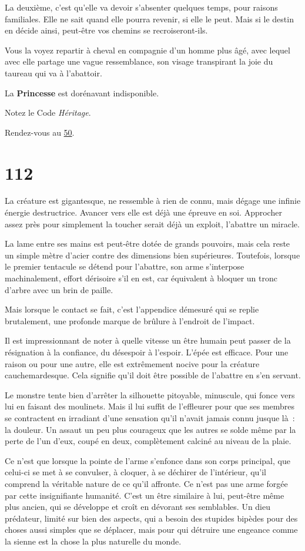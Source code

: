 \documentclass{report}
\newcommand{\gsection}[1]{
    \section{#1}
    \label{section-#1}
}
\newcommand{\glink}[1]{\hyperref[section-#1]{#1}}
\newcommand{\hero}[1]{\textbf{#1}}
\begin{document}
La deuxième, c'est qu'elle va devoir s'absenter quelques temps, pour raisons familiales. Elle ne sait quand elle pourra revenir, si elle le peut. Mais si le destin en décide ainsi, peut-être vos chemins se recroiseront-ils.

Vous la voyez repartir à cheval en compagnie d'un homme plus âgé, avec lequel avec elle partage une vague ressemblance, son visage transpirant la joie du taureau qui va à l'abattoir.

La \hero{Princesse} est dorénavant indisponible.

Notez le Code \emph{Héritage}.

Rendez-vous au \glink{50}.

\gsection{112}

La créature est gigantesque, ne ressemble à rien de connu, mais dégage une infinie énergie destructrice. Avancer vers elle est déjà une épreuve en soi. Approcher assez près pour simplement la toucher serait déjà un exploit, l'abattre un miracle.

La lame entre ses mains est peut-être dotée de grands pouvoirs, mais cela reste un simple mètre d'acier contre des dimensions bien supérieures. Toutefois, lorsque le premier tentacule se détend pour l'abattre, son arme s'interpose machinalement, effort dérisoire s'il en est, car équivalent à bloquer un tronc d'arbre avec un brin de paille.

Mais lorsque le contact se fait, c'est l'appendice démesuré qui se replie brutalement, une profonde marque de brûlure à l'endroit de l'impact.

Il est impressionnant de noter à quelle vitesse un être humain peut passer de la résignation à la confiance, du désespoir à l'espoir. L'épée est efficace. Pour une raison ou pour une autre, elle est extrêmement nocive pour la créature cauchemardesque. Cela signifie qu'il doit être possible de l'abattre en s'en servant.

Le monstre tente bien d'arrêter la silhouette pitoyable, minuscule, qui fonce vers lui en faisant des moulinets. Mais il lui suffit de l'effleurer pour que ses membres se contractent en irradiant d'une sensation qu'il n'avait jamais connu jusque là : la douleur. Un assaut un peu plus courageux que les autres se solde même par la perte de l'un d'eux, coupé en deux, complètement calciné au niveau de la plaie.

Ce n'est que lorsque la pointe de l'arme s'enfonce dans son corps principal, que celui-ci se met à se convulser, à cloquer, à se déchirer de l'intérieur, qu'il comprend la véritable nature de ce qu'il affronte. Ce n'est pas une arme forgée par cette insignifiante humanité. C'est un être similaire à lui, peut-être même plus ancien, qui se développe et croît en dévorant ses semblables. Un dieu prédateur, limité sur bien des aspects, qui a besoin des stupides bipèdes pour des choses aussi simples que se déplacer, mais pour qui détruire une engeance comme la sienne est la chose la plus naturelle du monde.
\end{document}
